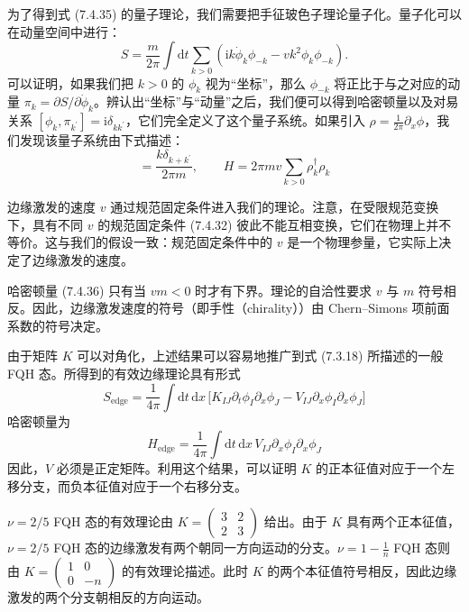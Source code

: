 为了得到式 (7.4.35) 的量子理论，我们需要把手征玻色子理论量子化。量子化可以在动量空间中进行：
\begin{equation*}
S=\frac{m}{2\pi}\int\mathrm{d}t\sum_{k>0}\left(\mathrm{i}k\dot{\phi}_{k}\phi_{-k}-vk^{2}\phi_{k}\phi_{-k}\right).
\end{equation*}
可以证明，如果我们把 $k>0$ 的 $\phi_{k}$ 视为``坐标''，那么 $\phi_{-k}$ 将正比于与之对应的动量 $\pi_{k}=\partial S/\partial\dot{\phi}_{k}$。辨认出``坐标''与``动量''之后，我们便可以得到哈密顿量以及对易关系 $[\phi_{k},\pi_{k^{\prime}}]=\mathrm{i}\delta_{kk^{\prime}}$，它们完全定义了这个量子系统。如果引入 $\rho=\frac{1}{2\pi}\partial_{x}\phi$，我们发现该量子系统由下式描述：
\begin{equation*}
[\rho_{k},\rho_{k^{\prime}}]=\frac{k\delta_{k+k^{\prime}}}{2\pi m},\qquad
H=2\pi mv\sum_{k>0}\rho_{k}^{\dagger}\rho_{k} \tag{7.4.36}
\end{equation*}

边缘激发的速度 $v$ 通过规范固定条件进入我们的理论。注意，在受限规范变换下，具有不同 $v$ 的规范固定条件 (7.4.32) 彼此不能互相变换，它们在物理上并不等价。这与我们的假设一致：规范固定条件中的 $v$ 是一个物理参量，它实际上决定了边缘激发的速度。

哈密顿量 (7.4.36) 只有当 $vm<0$ 时才有下界。理论的自洽性要求 $v$ 与 $m$ 符号相反。因此，边缘激发速度的符号（即手性（chirality））由 Chern--Simons 项前面系数的符号决定。

由于矩阵 $K$ 可以对角化，上述结果可以容易地推广到式 (7.3.18) 所描述的一般 FQH 态。所得到的有效边缘理论具有形式
\begin{equation*}
S_{\mathrm{edge}}=\frac{1}{4\pi}\int\mathrm{d}t\,\mathrm{d}x\,\bigl[K_{IJ}\partial_{t}\phi_{I}\partial_{x}\phi_{J}-V_{IJ}\partial_{x}\phi_{I}\partial_{x}\phi_{J}\bigr] \tag{7.4.37}
\end{equation*}
哈密顿量为
\begin{equation*}
H_{\mathrm{edge}}=\frac{1}{4\pi}\int\mathrm{d}t\,\mathrm{d}x\,V_{IJ}\partial_{x}\phi_{I}\partial_{x}\phi_{J}
\end{equation*}
因此，$V$ 必须是正定矩阵。利用这个结果，可以证明 $K$ 的正本征值对应于一个左移分支，而负本征值对应于一个右移分支。

$\nu=2/5$ FQH 态的有效理论由 $K=\begin{pmatrix}3 & 2\\ 2 & 3\end{pmatrix}$ 给出。由于 $K$ 具有两个正本征值，$\nu=2/5$ FQH 态的边缘激发有两个朝同一方向运动的分支。$\nu=1-\frac{1}{n}$ FQH 态则由 $K=\begin{pmatrix}1 & 0\\ 0 & -n\end{pmatrix}$ 的有效理论描述。此时 $K$ 的两个本征值符号相反，因此边缘激发的两个分支朝相反的方向运动。


